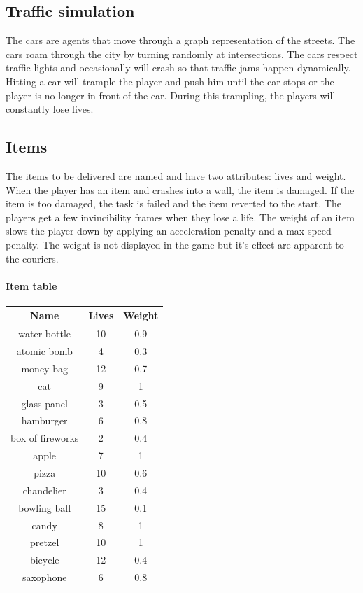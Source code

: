 \documentclass[12pt]{article}
\begin{document}
\subsection{Traffic simulation}
The cars are agents that move through a graph representation of the streets. The cars roam through the city by turning randomly at intersections. The cars respect traffic lights and occasionally will crash so that traffic jams happen dynamically. Hitting a car will trample the player and push him until the car stops or the player is no longer in front of the car. During this trampling, the players will constantly lose lives.

\subsection{Items}
The items to be delivered are named and have two attributes: lives and weight. When the player has an item and crashes into a wall, the item is damaged. If the item is too damaged, the task is failed and the item reverted to the start. The players get a few invincibility frames when they lose a life. The weight of an item slows the player down by applying an acceleration penalty and a max speed penalty. The weight is not displayed in the game but it's effect are apparent to the couriers.

\paragraph{Item table}

\begin{center}
\begin{tabular}{ |c|c|c| } 
 \hline
 Name & Lives & Weight \\ 
\hline
water bottle & 10 & 0.9\\
atomic bomb & 4 & 0.3\\
money bag & 12 & 0.7\\
cat & 9 & 1\\
glass panel & 3 & 0.5\\
hamburger & 6 & 0.8\\
box of fireworks & 2 & 0.4\\
apple & 7 & 1\\
pizza & 10 & 0.6\\
chandelier & 3 & 0.4\\
bowling ball & 15 & 0.1\\
candy & 8 & 1\\
pretzel & 10 & 1\\
bicycle & 12 & 0.4\\
saxophone & 6 & 0.8\\
 \hline
\end{tabular}
\end{center}
\end{document}
